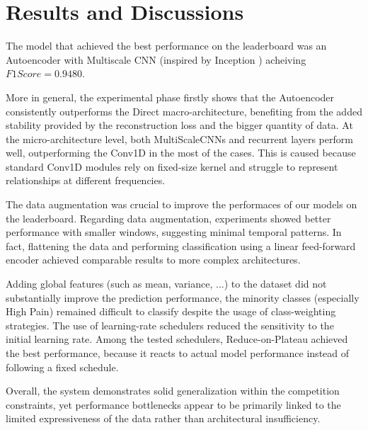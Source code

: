 \vspace{-15pt}
\section{Results and Discussions}
\vspace{-10pt}
The model that achieved the best performance on the leaderboard was an Autoencoder with Multiscale CNN (inspired by Inception \cite{DBLP:journals/corr/SzegedyLJSRAEVR14}) acheiving $F1Score = 0.9480$.

More in general, the experimental phase firstly shows that the Autoencoder consistently outperforms the Direct macro-architecture, benefiting from the added stability provided by the reconstruction loss and the bigger quantity of data. At the micro-architecture level, both MultiScaleCNNs and recurrent layers perform well, outperforming the Conv1D in the most of the cases. This is caused because standard Conv1D modules rely on fixed-size kernel and struggle to represent relationships at different frequencies.

The data augmentation was crucial to improve
the performaces of our models on the leaderboard. Regarding data augmentation, experiments showed better performance with smaller windows, suggesting minimal temporal patterns. In fact, flattening the data and performing classification using a linear feed-forward encoder achieved comparable results to more complex architectures.

Adding global features (such as mean, variance, ...) to the dataset did not substantially improve the prediction performance, the minority classes (especially High Pain) remained difficult to classify despite the usage of class-weighting strategies.
The use of learning-rate schedulers reduced the sensitivity to the initial learning rate. Among the tested schedulers, Reduce-on-Plateau achieved the best performance, because it reacts to actual model performance instead of following a fixed schedule.

Overall, the system demonstrates solid generalization within the competition constraints, yet performance bottlenecks appear to be primarily linked to the limited expressiveness of the data rather than architectural insufficiency.
\vspace{-10pt}


